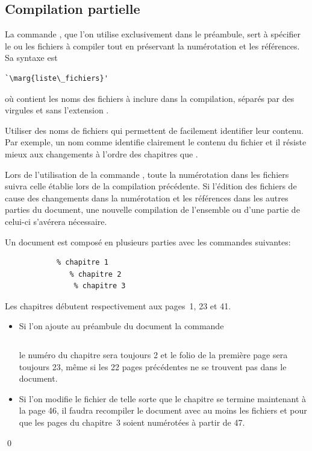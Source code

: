 \subsection{Compilation partielle}
\label{sec:organisation:include:compilation}

La commande \cmd{}, que l'on utilise exclusivement dans le
préambule, sert à spécifier le ou les fichiers à compiler tout en
préservant la numérotation et les références. Sa syntaxe est
\begin{lstlisting}
`\marg{liste\_fichiers}'
\end{lstlisting}
où  contient les noms des fichiers à
inclure dans la compilation, séparés par des virgules et sans
l'extension .

\begin{conseil}
  Utiliser des noms de fichiers qui permettent de facilement
  identifier leur contenu. Par exemple, un nom comme
   identifie clairement le contenu du fichier et
  il résiste mieux aux changements à l'ordre des chapitres que
  .
\end{conseil}

Lors de l'utilisation de la commande \cmd{}, toute la
numérotation dans les fichiers  suivra celle
établie lors de la compilation précédente. Si l'édition des fichiers
de  cause des changements dans la numérotation
et les références dans les autres parties du document, une nouvelle
compilation de l'ensemble ou d'une partie de celui-ci s'avérera
nécessaire.

\begin{exemple}
  Un document est composé en plusieurs parties avec les commandes
  suivantes:
\begin{lstlisting}
            % chapitre 1
               % chapitre 2
                % chapitre 3
\end{lstlisting}
  Les chapitres débutent respectivement aux pages~1, 23 et 41.
  \begin{itemize}
  \item Si l'on ajoute au préambule du document la commande
\begin{lstlisting}

\end{lstlisting}
    le numéro du chapitre sera toujours 2 et le folio de
    la première page sera toujours 23, même si les 22 pages
    précédentes ne se trouvent pas dans le document.
  \item Si l'on modifie le fichier  de telle
    sorte que le chapitre se termine maintenant à la page 46, il
    faudra recompiler le document avec au moins les fichiers
     et  pour que les pages du
    chapitre~3 soient numérotées à partir de 47.
  \end{itemize}
  \qed
\end{exemple}

